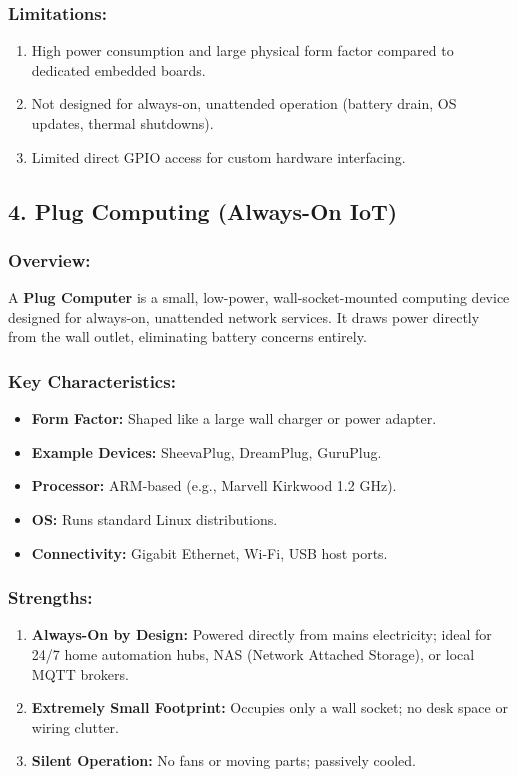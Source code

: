 \subsubsection{Limitations:}
\begin{enumerate}
  \item High power consumption and large physical form factor compared to dedicated embedded boards.
  \item Not designed for always-on, unattended operation (battery drain, OS updates, thermal shutdowns).
  \item Limited direct GPIO access for custom hardware interfacing.
\end{enumerate}


\subsection{4. Plug Computing (Always-On IoT)}

\subsubsection{Overview:}
A \textbf{Plug Computer} is a small, low-power, wall-socket-mounted computing device designed for always-on, unattended network services. It draws power directly from the wall outlet, eliminating battery concerns entirely.

\subsubsection{Key Characteristics:}
\begin{itemize}
  \item   \textbf{Form Factor:} Shaped like a large wall charger or power adapter.
  \item   \textbf{Example Devices:} SheevaPlug, DreamPlug, GuruPlug.
  \item   \textbf{Processor:} ARM-based (e.g., Marvell Kirkwood 1.2 GHz).
  \item   \textbf{OS:} Runs standard Linux distributions.
  \item   \textbf{Connectivity:} Gigabit Ethernet, Wi-Fi, USB host ports.
\end{itemize}

\subsubsection{Strengths:}
\begin{enumerate}
  \item \textbf{Always-On by Design:} Powered directly from mains electricity; ideal for 24/7 home automation hubs, NAS (Network Attached Storage), or local MQTT brokers.
  \item \textbf{Extremely Small Footprint:} Occupies only a wall socket; no desk space or wiring clutter.
  \item \textbf{Silent Operation:} No fans or moving parts; passively cooled.
\end{enumerate}

